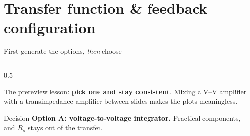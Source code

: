 \documentclass[aspectratio=169,9pt]{beamer}
\begin{document}
\section{Transfer function \& feedback configuration}

\begin{frame}{First generate the options, \emph{then} choose}
  \begin{columns}[T]
    \begin{column}{0.5\textwidth}
      \begin{antoonbox}
      The prereview lesson: \textbf{pick one and stay consistent}. Mixing a V--V amplifier with
      a transimpedance amplifier between slides makes the plots meaningless.
      \end{antoonbox}
      \begin{block}{Decision}
        \textbf{Option A: voltage-to-voltage integrator.} Practical components, and $R_s$ stays out
        of the transfer.
      \end{block}
    \end{column}
  \end{columns}
\end{frame}
\end{document}
